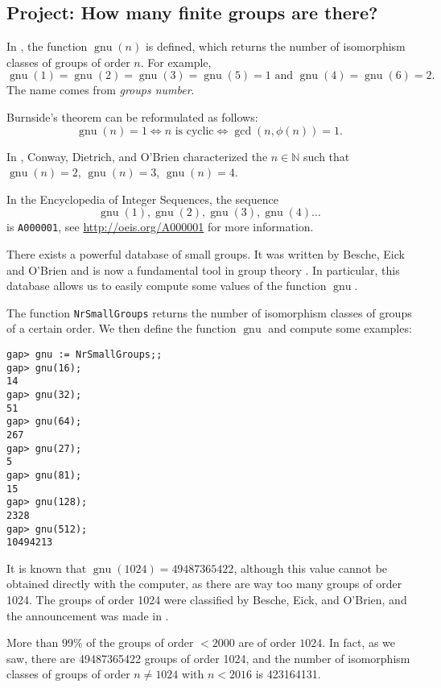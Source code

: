 \subsection{Project: How many finite groups are there?}

In \cite{MR2410121}, the function $\operatorname{gnu}(n)$ is defined, which returns the number of isomorphism classes of groups of order $n$. For example, \[
\operatorname{gnu}(1)=\operatorname{gnu}(2)=\operatorname{gnu}(3)=\operatorname{gnu}(5)=1\text{ and }\operatorname{gnu}(4)=\operatorname{gnu}(6)=2.
\]
The name comes from \emph{\emph{g}roups \emph{nu}mber}.

Burnside's theorem can be reformulated as follows:
\[
\operatorname{gnu}(n)=1 \Longleftrightarrow \text{$n$ is cyclic} \Longleftrightarrow \gcd(n,\phi(n))=1.
\]

In \cite{MR2410121}, Conway, Dietrich, and O'Brien characterized the $n\in\mathbb{N}$ such that $\operatorname{gnu}(n)=2$, $\operatorname{gnu}(n)=3$, $\operatorname{gnu}(n)=4$.

In the Encyclopedia of Integer Sequences, the sequence
\[
\operatorname{gnu}(1),\operatorname{gnu}(2),\operatorname{gnu}(3),\operatorname{gnu}(4)\dots
\]
is \lstinline{A000001}, see \url{http://oeis.org/A000001} for more information.

There exists a powerful database of small groups. It was 
written by Besche, Eick and O'Brien and is now a fundamental tool in group theory \cite{MR1935567}. In particular, this database allows us to easily compute some values of the function $\operatorname{gnu}$.

The function \lstinline{NrSmallGroups} returns the number of isomorphism classes of groups of a certain order. We then define the function $\operatorname{gnu}$ and compute some examples:

\begin{lstlisting}
gap> gnu := NrSmallGroups;;
gap> gnu(16);
14
gap> gnu(32);
51
gap> gnu(64);
267
gap> gnu(27);
5
gap> gnu(81);
15
gap> gnu(128);
2328
gap> gnu(512);
10494213
\end{lstlisting}

It is known that $\operatorname{gnu}(1024)=49487365422$, although this value cannot be obtained directly with the computer, as there are way too many 
groups of order 1024. The groups of order 1024 were classified by Besche, Eick, and O'Brien, and the announcement was made in \cite{MR1826989}.

More than 99\% of the groups of order $<2000$ are of order $1024$. In fact, as we saw, there are 49487365422 groups of order 1024, and the number of isomorphism classes of groups of order $n\ne1024$ with $n<2016$ is 423164131.

